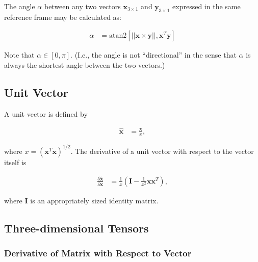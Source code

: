 \documentclass[]{article}
\newcommand{\vb}[1]{\bm{#1}} %
\newcommand{\vbh}[1]{\hat{\bm{#1}}} %
\newcommand{\pd}[2]{\frac{\partial #1}{\partial #2}} %
\begin{document}
The angle $\alpha$ between any two vectors $\vb{x}_{3 \times 1}$ and $\vb{y}_{3 \times 1}$ expressed in the same reference frame may be calculated as:

\begin{align}
	\label{eq:angle_between_2_vectors}
	\alpha &= \mathrm{atan2} \left[ || \vb{x} \times \vb{y} ||, \vb{x}^T \vb{y} \right]
\end{align}

Note that $\alpha \in [0, \pi]$. (I.e., the angle is not ``directional'' in the sense that $\alpha$ is always the shortest angle between the two vectors.)

\subsection{Unit Vector}
\label{sec:unit_vector}

A unit vector is defined by

\begin{align}
	\vbh{x} &= \frac{\vb{x}}{x},
\end{align}

\noindent where $x = \left(\vb{x}^T \vb{x} \right)^{1/2}$. The derivative of a unit vector with respect to the vector itself is

\begin{align}
	\label{eq:unit_vector_derivative}
	\pd{\vbh{x}}{\vb{x}} &= \frac{1}{x} \left( \vb{I} - \frac{1}{x^2} \vb{x} \vb{x}^T \right),
\end{align}

\noindent where $\vb{I}$ is an appropriately sized identity matrix.

\subsection{Three-dimensional Tensors}
\label{sec:tensor_math}

\subsubsection{Derivative of Matrix with Respect to Vector}
\label{sec:matrix_derivative_wrt_vector}
\end{document}
